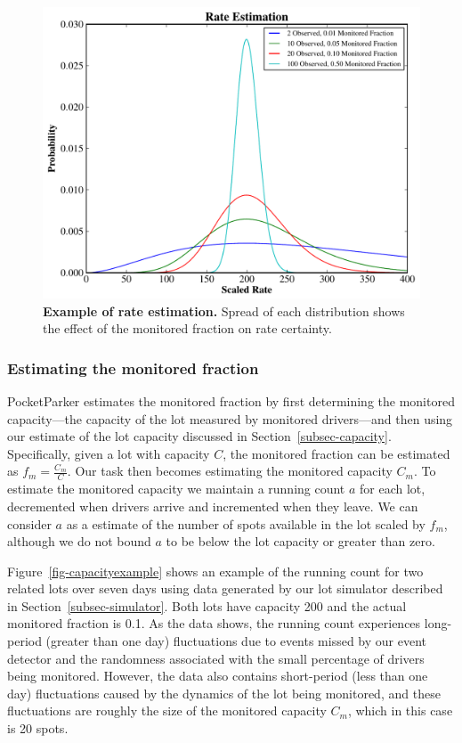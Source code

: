 \begin{figure}
\centering
\includegraphics[width=\columnwidth]{./figures/rates.pdf}

\caption{\textbf{Example of rate estimation.} Spread of each distribution
shows the effect of the monitored fraction on rate certainty.}

\label{fig-rateexample}
\end{figure}

\subsubsection{Estimating the monitored fraction}
\label{subsubsec-monitored}

PocketParker estimates the monitored fraction by first determining the
monitored capacity---the capacity of the lot measured by monitored
drivers---and then using our estimate of the lot capacity discussed in
Section~\ref{subsec-capacity}. Specifically, given a lot with capacity $C$,
the monitored fraction can be estimated as $f_m = \frac{C_m}{C}$. Our task
then becomes estimating the monitored capacity $C_m$. To estimate the
monitored capacity we maintain a running count $a$ for each lot, decremented
when drivers arrive and incremented when they leave. We can consider $a$ as a
estimate of the number of spots available in the lot scaled by $f_m$,
although we do not bound $a$ to be below the lot capacity or greater than
zero.

Figure~\ref{fig-capacityexample} shows an example of the running count for
two related lots over seven days using data generated by our lot simulator
described in Section~\ref{subsec-simulator}. Both lots have capacity 200 and
the actual monitored fraction is 0.1. As the data shows, the running count
experiences long-period (greater than one day) fluctuations due to events
missed by our event detector and the randomness associated with the small
percentage of drivers being monitored. However, the data also contains
short-period (less than one day) fluctuations caused by the dynamics of the
lot being monitored, and these fluctuations are roughly the size of the
monitored capacity $C_m$, which in this case is 20 spots.

